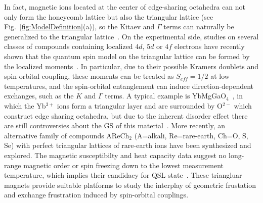 \documentclass[aps,prb,reprint,amsfonts,amsmath,amssymb,showpacs,groupedaddress,superscriptaddress]{revtex4-1}
\begin{document}
In fact, magnetic ions located at the center of edge-sharing octahedra can not only form the honeycomb lattice but also the triangular lattice (see Fig.~\ref{fig:ModelDefinition}(a)), so the Kitaev and $\Gamma$ terms can naturally be generalized to the triangular lattice~\cite{PhysRevB.89.014414,PhysRevB.93.104417}. On the experimental side, studies on several classes of  compounds containing localized $4d$, $5d$ or $4f$ electrons have recently shown that the quantum spin model on the triangular lattice can be formed by the localized moments~\cite{PhysRevB.86.140405,PhysRevB.94.174410,srep16419,PhysRevLett.115.167203,PhysRevLett.120.087201,CEVALLOS2018154,10.1038/s41535-019-0151-6}. In particular, due to their possible Kramers doublets and spin-orbital coupling, these moments can be treated as $S_{eff}=1/2$ at low temperatures, and the spin-orbital entanglement can induce direction-dependent exchanges, such as the $K$ and $\Gamma$ terms. A typical example is YbMgGaO$_{4}$~\cite{srep16419,PhysRevLett.115.167203}, in which the Yb$^{3+}$ ions form a triangular layer and are surrounded by O$^{2-}$ which construct edge sharing octahedra, but due to the inherent disorder effect there are still controversies about the GS of this material~\cite{srep16419,PhysRevLett.115.167203,PhysRevLett.120.087201,PhysRevB.94.035107,Nature20614,nphys3971,PhysRevLett.117.267202,PhysRevX.8.031028,SciPostPhys.4.1.003,PhysRevB.97.184413}. More recently, an alternative family of compounds AReCh$_2$ (A=alkali, Re=rare-earth, Ch=O, S, Se) with perfect triangular lattices of rare-earth ions have been synthesized and explored. The magnetic susceptibilty and heat capacity data suggest no long-range magnetic order or spin freezing down to the lowest measurement temperature, which implies their candidacy for QSL state~\cite{acsmaterialslett.9b00464,PhysRevMaterials.3.114413,PhysRevB.100.241116,Liu_2018,PhysRevB.99.180401,PhysRevB.100.224417,PhysRevB.100.144432}. These triangluar magnets provide suitable platforms to study the interplay of geometric frustation and exchange frustration induced by spin-orbital couplings.
\end{document}
